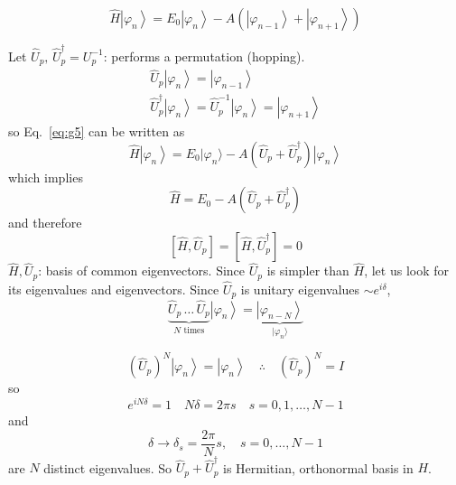 \documentclass[12pt]{article}
\newcommand{\be}{\begin{equation}}
\newcommand{\ee}{\end{equation}}
\begin{document}
\be
\hat{H}\left|\varphi_{n}\right\rangle=E_{0}\left|\varphi_{n}\right\rangle-A\left(\left|\varphi_{n-1}\right\rangle+\left|\varphi_{n+1}\right\rangle\right)
\label{eq:g5}
\ee

Let $\hat{U}_{p},\,\hat{U}_{p}^{\dagger}=U_{p}^{-1}$: performs a permutation (hopping).
\be
\begin{array}{l}
\hat{U}_{p}\left|\varphi_{n}\right\rangle=\left|\varphi_{n-1}\right\rangle \\ 
\hat{U}_{p}^{\dagger}\left|\varphi_{n}\right\rangle=\hat{U}_{p}^{-1}\left|\varphi_{n}\right\rangle=\left|\varphi_{n+1}\right\rangle
\end{array}
\ee
so Eq.~\ref{eq:g5} can be written as
\[
\hat{H}\left|\varphi_{n}\right\rangle=E_{0} |\varphi_{n}\rangle-A\left(\hat{U}_{p}+\hat{U}_{p}^{\dagger}\right)\left|\varphi_{n}\right\rangle
\]
which implies
\be
\hat{H}=E_{0}-A\left(\hat{U}_{p}+\hat{U}_{p}^\dagger\right)
\ee
and therefore
\be
\left[\hat{H}, \hat{U}_{p}\right]=\left[\hat{H}, \hat{U}_{p}^{\dagger}\right]=0
\ee
$\hat{H}, \hat{U}_{p}$: basis of common eigenvectors.
Since $\hat{U}_{p}$ is simpler than $\hat{H}$, let us look for its
eigenvalues and eigenvectors. Since $\hat{U}_p$ is unitary
eigenvalues 
$\sim e^{i\delta}$, 
\[\underbrace{\hat{U}_{p}\,\ldots\,\hat{U}_{p}}%
_{N\textrm{ times}}
\left|\varphi_{n}\right\rangle=
\underbrace{\left|\varphi_{n-N}\right\rangle}%
_{|\varphi_{n}\rangle}
\]

\be
\left(\hat{U}_{p}\right)^{N}\left|\varphi_{n}\right\rangle=\left|\varphi_{n}\right\rangle
\quad\therefore\quad
\left(\hat{U}_{p}\right)^{N}=I
\ee
so
\be
e^{i N \delta}=1 \quad N \delta=2 \pi s \quad s=0,1, \ldots, N-1
\ee
and
\be
\delta \rightarrow \delta_{s}=\frac{2\pi}{N} s, \quad s=0, \ldots, N-1
\ee
are $N$ distinct eigenvalues.
So $\hat{U}_{p}+\hat{U}_{p}^{\dagger}$ is Hermitian, orthonormal basis in $H$.
\end{document}

